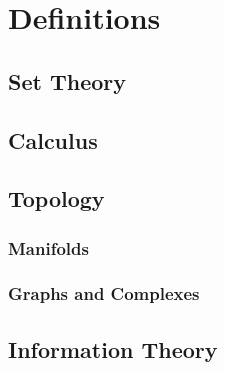 
\chapter{Definitions}

\section{Set Theory}
\section{Calculus}
\section{Topology}
\subsection{Manifolds}
\subsection{Graphs and Complexes}
\section{Information Theory}
